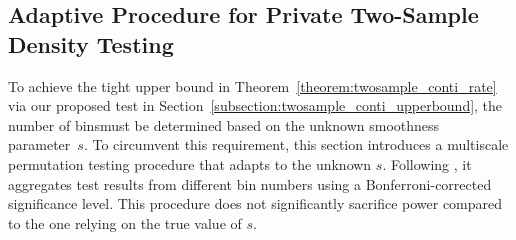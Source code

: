\documentclass[twoside,11pt]{article}
\newcommand{\smoothness}{s}
\begin{document}
\subsection{Adaptive Procedure for Private Two-Sample Density Testing }\label{subsection:adaptive}%
To achieve the tight upper bound in Theorem~\ref{theorem:twosample_conti_rate} via our proposed test in Section~\ref{subsection:twosample_conti_upperbound}, the number of binsmust be determined based on the unknown smoothness parameter~$\smoothness$. To circumvent this requirement, this section introduces a multiscale permutation testing procedure that  adapts to the unknown $\smoothness$. 
Following \citet{Ingster2000AdaptiveTests}, it aggregates test results from different bin numbers using a Bonferroni-corrected significance level. This procedure does not significantly sacrifice power compared to the one relying on the true value of $s$.
\end{document}
